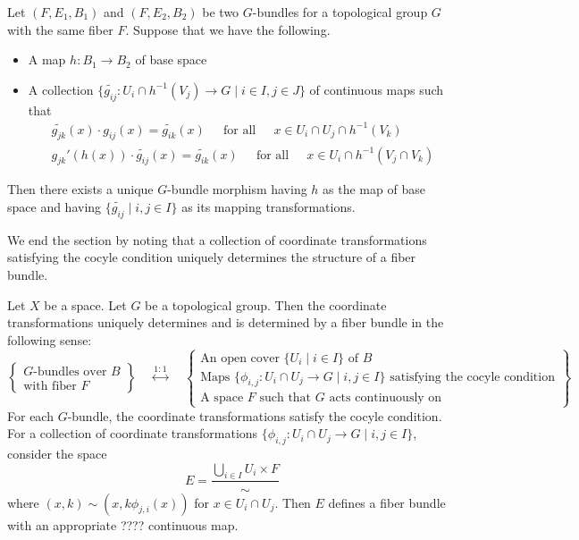 \documentclass[a4paper]{article}
\begin{document}
\begin{thm}{}{} Let $(F,E_1,B_1)$ and $(F,E_2,B_2)$ be two $G$-bundles for a topological group $G$ with the same fiber $F$. Suppose that we have the following. 
\begin{itemize}
\item A map $h:B_1\to B_2$ of base space
\item A collection $\{\widetilde{g_{ij}}:U_i\cap h^{-1}(V_j)\to G\;|\;i\in I,j\in J\}$ of continuous maps such that \begin{gather*}
\widetilde{g_{jk}}(x)\cdot g_{ij}(x)=\widetilde{g_{ik}}(x)\;\;\;\;\text{ for all }\;\;\;\;x\in U_i\cap U_j\cap h^{-1}(V_k)\\
g_{jk}'(h(x))\cdot\widetilde{g_{ij}}(x)=\widetilde{g_{ik}}(x)\;\;\;\;\text{ for all }\;\;\;\;x\in U_i\cap h^{-1}(V_j\cap V_k)
\end{gather*}
\end{itemize}
Then there exists a unique $G$-bundle morphism having $h$ as the map of base space and having $\{\widetilde{g_{ij}}\;|\;i,j\in I\}$ as its mapping transformations. 
\end{thm}

We end the section by noting that a collection of coordinate transformations satisfying the cocyle condition uniquely determines the structure of a fiber bundle. 

\begin{thm}{}{} Let $X$ be a space. Let $G$ be a topological group. Then the coordinate transformations uniquely determines and is determined by a fiber bundle in the following sense: $$\left\{\substack{G\text{-bundles over }B\\\text{with fiber }F}\right\}\;\;\;\;\overset{1:1}{\longleftrightarrow}\;\;\;\;\left\{\substack{\text{An open cover }\{U_i\;|\;i\in I\}\text{ of }B\\\text{Maps }\{\phi_{i,j}:U_i\cap U_j\to G\;|\;i,j\in I\}\text{ satisfying the cocyle condition}\\\text{A space }F\text{ such that }G\text{ acts continuously on}}\right\}$$ For each $G$-bundle, the coordinate transformations satisfy the cocyle condition. For a collection of coordinate transformations $\{\phi_{i,j}:U_i\cap U_j\to G\;|\;i,j\in I\}$, consider the space $$E=\frac{\bigcup_{i\in I}U_i\times F}{\sim}$$ where $(x,k)\sim(x,k\phi_{j,i}(x))$ for $x\in U_i\cap U_j$. Then $E$ defines a fiber bundle with an appropriate ???? continuous map. 
\end{thm}
\end{document}
